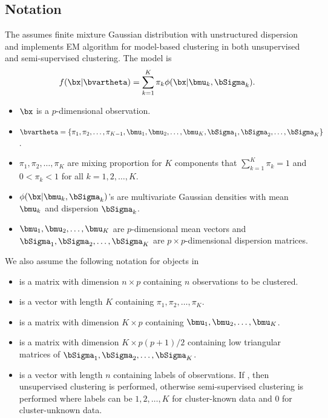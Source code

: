 \subsection[Notation]{Notation}
The  assumes finite mixture Gaussian distribution with
unstructured dispersion and implements EM algorithm for model-based clustering
in both unsupervised and semi-supervised clustering. The model is
\begin{equation}
f(\bx | \bvartheta) = \sum_{k = 1}^K \pi_k \phi(\bx | \bmu_k, \bSigma_k).
\label{eqn:density_mvn}
\end{equation}
\begin{itemize}
\item
  $\bx$ is a $p$-dimensional observation.
\item
  $\bvartheta = \{\pi_1,\pi_2,\ldots,\pi_{K-1},\bmu_1,\bmu_2,\ldots,\bmu_K,
    \bSigma_1,\bSigma_2,\ldots,\bSigma_K\}$.
\item
  $\pi_1,\pi_2,\ldots,\pi_K$ are mixing proportion for $K$ components that
  $\sum_{k = 1}^K \pi_k = 1$ and $0 < \pi_k < 1$ for all $k=1,2,\ldots,K$.
\item
  $\phi(\bx|\bmu_k,\bSigma_k)$'s are multivariate Gaussian densities with mean
  $\bmu_k$ and dispersion $\bSigma_k$.
\item
  $\bmu_1,\bmu_2,\ldots,\bmu_K$ are $p$-dimensional mean vectors and
  $\bSigma_1,\bSigma_2,\ldots,\bSigma_K$ are $p\times p$-dimensional
  dispersion matrices.
\end{itemize}

We also assume the following notation for  objects
in 
\begin{itemize}
\item
   is a matrix with dimension $n\times p$
  containing $n$ observations to be clustered.
\item
   is a vector with length $K$ containing $\pi_1,\pi_2,\ldots,\pi_K$.
\item
   is a matrix with dimension $K\times p$ containing
  $\bmu_1,\bmu_2,\ldots,\bmu_K$.
\item
   is a matrix with dimension $K\times p(p+1)/2$ containing
  low triangular matrices of $\bSigma_1,\bSigma_2,\ldots,\bSigma_K$.
\item
   is a vector with length $n$ containing labels of observations.
  If , then unsupervised clustering is performed, otherwise
  semi-supervised clustering is performed where labels can be
  $1, 2,\ldots,K$ for cluster-known data and $0$ for cluster-unknown data.
\end{itemize}

